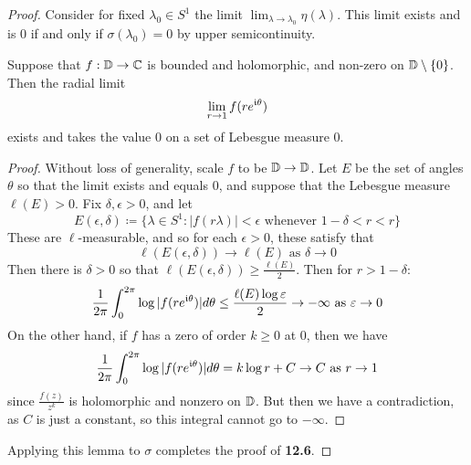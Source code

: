 \documentclass[10pt,a4paper]{article}
\begin{document}
\begin{proof}
  Consider for fixed $\lambda_0 \in S^1$ the limit $\lim_{\lambda \to \lambda_0} \eta(\lambda)$. This limit exists and is 0 if and only if $\sigma(\lambda_0) = 0$ by upper semicontinuity.

  \begin{lemma}
    Suppose that $f:\mathbb{D} \to \mathbb{C}$ is bounded and holomorphic, and non-zero on $\mathbb{D}\setminus\{0\}$. Then the radial limit
    \[\lim_{r\to 1}f(re^{\mathfrak{i}\theta})\]
    exists and takes the value 0 on a set of Lebesgue measure 0.
  \end{lemma}
  \begin{proof}
    Without loss of generality, scale $f$ to be $\mathbb{D} \to \mathbb{D}$. Let $E$ be the set of angles $\theta$ so that the limit exists and equals 0, and suppose that the Lebesgue measure $\ell(E) >0$. Fix $\delta, \epsilon > 0$, and let
    \[E(\epsilon, \delta) \coloneqq \{\lambda \in S^1 : |f(r\lambda)| < \epsilon \text{ whenever }1-\delta <r < r\}\]
    These are $\ell$-measurable, and so for each $\epsilon >0$, these satisfy that
    \[\ell(E(\epsilon, \delta)) \to \ell(E)\text{ as } \delta \to 0\]
    Then there is $\delta > 0$ so that $\ell(E(\epsilon, \delta)) \geq \frac{\ell(E)}{2}$. Then for $r > 1-\delta$:
    \[\frac{1}{2\pi}\int_0^{2\pi} \log|f(re^{\mathfrak{i}\theta})| d \theta \leq \frac{\ell(E)\log \varepsilon}{2} \to -\infty \text{ as } \varepsilon \to 0\]
    On the other hand, if $f$ has a zero of order $k \geq 0$ at 0, then we have
    \[\frac{1}{2\pi}\int_0^{2\pi}\log|f(re^{\mathfrak{i}\theta})|d\theta = k\log r + C \to C \text{ as } r \to 1\]
    since $\frac{f(z)}{z^k}$ is holomorphic and nonzero on $\mathbb{D}$. But then we have a contradiction, as $C$ is just a constant, so this integral cannot go to $-\infty$.
  \end{proof}
  Applying this lemma to $\sigma$ completes the proof of \textbf{12.6}.
\end{proof}
\end{document}

